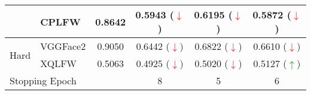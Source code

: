 \documentclass[class=report, crop=false, a4paper, 12pt]{standalone}
\begin{document}
\begin{table}[H]
{\begin{tabular}{clcccc}
    \multicolumn{1}{|c|}{}                         & \multicolumn{1}{l|}{CPLFW}    & \multicolumn{1}{c|}{0.8642}   & \multicolumn{1}{c|}{0.5943 (\textcolor{red}{$\downarrow$})} & \multicolumn{1}{c|}{0.6195 (\textcolor{red}{$\downarrow$})} & \multicolumn{1}{c|}{0.5872 (\textcolor{red}{$\downarrow$})} \\ \hline
    \multicolumn{1}{|c|}{\multirow{2}{*}{Hard}}    & \multicolumn{1}{l|}{VGGFace2} & \multicolumn{1}{c|}{0.9050}   & \multicolumn{1}{c|}{0.6442 (\textcolor{red}{$\downarrow$})} & \multicolumn{1}{c|}{0.6822 (\textcolor{red}{$\downarrow$})} & \multicolumn{1}{c|}{0.6610 (\textcolor{red}{$\downarrow$})} \\ \cline{2-6} 
    \multicolumn{1}{|c|}{}                         & \multicolumn{1}{l|}{XQLFW}    & \multicolumn{1}{c|}{0.5063}   & \multicolumn{1}{c|}{0.4925 (\textcolor{red}{$\downarrow$})} & \multicolumn{1}{c|}{0.5020 (\textcolor{red}{$\downarrow$})} & \multicolumn{1}{c|}{0.5127 (\textcolor{green}{$\uparrow$})}   \\ \hline
    \multicolumn{3}{|l|}{Stopping Epoch}                                                                           & \multicolumn{1}{c|}{8}           & \multicolumn{1}{c|}{5}           & \multicolumn{1}{c|}{6}           \\ \hline
    \end{tabular}%
    }
\end{table}
\end{document}
